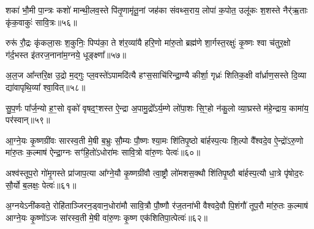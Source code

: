 {\anuvakamend[{}]}

शका॑ भौ॒मी पा॒न्त्रः कशो॑ मान्थी॒लव॒स्ते पि॑तृ॒णामृ॑तू॒नां जह॑का संवथ्स॒राय॒ लोपा॑ क॒पोत॒ उलू॑कः श॒शस्ते नैर्\mbox{}॑ऋ॒ताः कृ॑क॒वाकुः॑ सावि॒त्रः॥५६॥

{\anuvakamend[{बला॑य पुरुषमृ॒गः सौ॒री पृ॑ष॒तः शका॒ष्टाद॑शा॒ष्टाद॑श॥14-18॥}]}

रुरू॑ रौ॒द्रः कृ॑कला॒सः श॒कुनिः॒ पिप्प॑का॒ ते श॑र॒व्या॑यै हरि॒णो मा॑रु॒तो ब्रह्म॑णे शा॒र्गस्त॒रक्षुः॑ कृ॒ष्णः श्वा च॑तुर॒क्षो ग॑र्द॒भस्त इ॑तरज॒नाना॑म॒ग्नये॒ धूङ्क्ष्णा᳚॥५७॥

{\anuvakamend[{रुरु॑र्विꣳश॒तिः॥19॥}]}

अ॒ल॒ज आ᳚न्तरि॒क्ष उ॒द्रो म॒द्गुः प्ल॒वस्ते॑\-ऽपामदि॑त्यै हꣳस॒साचि॑रिन्द्रा॒ण्यै कीर्\mbox{}शा॒ गृध्रः॑ शितिक॒क्षी वा᳚र्ध्राण॒सस्ते दि॒व्या द्या॑वापृथि॒व्या᳚ श्वा॒वित्॥५८॥

{\anuvakamend[{}]}

सु॒प॒र्णः पा᳚र्ज॒न्यो ह॒ꣳ॒सो वृको॑ वृषद॒ꣳ॒शस्त ऐ॒न्द्रा अ॒पामु॒द्रो᳚\-ऽर्य॒म्णे लो॑पा॒शः सि॒ꣳ॒हो न॑कु॒लो व्या॒घ्रस्ते म॑हे॒न्द्राय॒ कामा॑य॒ पर॑स्वान्॥५९॥

{\anuvakamend[{अ॒ल॒जः सु॑प॒र्णो᳚\-ऽष्टाद॑शाष्टा॒द॑श॥21॥}]}

आ॒ग्ने॒यः कृ॒ष्णग्री॑वः सारस्व॒ती मे॒षी ब॒भ्रुः सौ॒म्यः पौ॒ष्णः श्या॒मः शि॑तिपृ॒ष्ठो बा॑र्\mbox{}हस्प॒त्यः शि॒ल्पो वै᳚श्वदे॒व ऐ॒न्द्रो॑\-ऽरु॒णो मा॑रु॒तः क॒ल्माष॑ ऐन्द्रा॒ग्नः सꣳ॑हि॒तो॑\-ऽधोरा॑मः सावि॒त्रो वा॑रु॒णः पेत्वः॑॥६०॥

{\anuvakamend[{आ॒ग्ने॒यो द्वाविꣳ॑शतिः॥22॥}]}

अश्व॑स्तूप॒रो गो॑मृ॒गस्ते प्रा॑जाप॒त्या आ᳚ग्ने॒यौ कृ॒ष्णग्री॑वौ त्वा॒ष्ट्रौ लो॑मशस॒क्थौ शि॑तिपृ॒ष्ठौ बा॑र्\mbox{}हस्प॒त्यौ धा॒त्रे पृ॑षोद॒रः सौ॒र्यो ब॒लक्षः॒ पेत्वः॑॥६१॥

{\anuvakamend[{अश्व॒ष्षोड॑श॥23॥}]}

अ॒ग्नये\-ऽनी॑कवते॒ रोहि॑ताञ्जिरन॒ड्वान॒धोरा॑मौ सावि॒त्रौ पौ॒ष्णौ र॑ज॒तना॑भी वैश्वदे॒वौ पि॒शंगौ॑ तूप॒रौ मा॑रु॒तः क॒ल्माष॑ आग्ने॒यः कृ॒ष्णो॑\-ऽजः सा॑रस्व॒ती मे॒षी वा॑रु॒णः कृ॒ष्ण एक॑शितिपा॒त्पेत्वः॑॥६२॥


{\anuvakamend[{अ॒ग्नयो\-ऽनी॑कवते॒ द्वाविꣳ॑शतिः॥24॥}]}

{}

